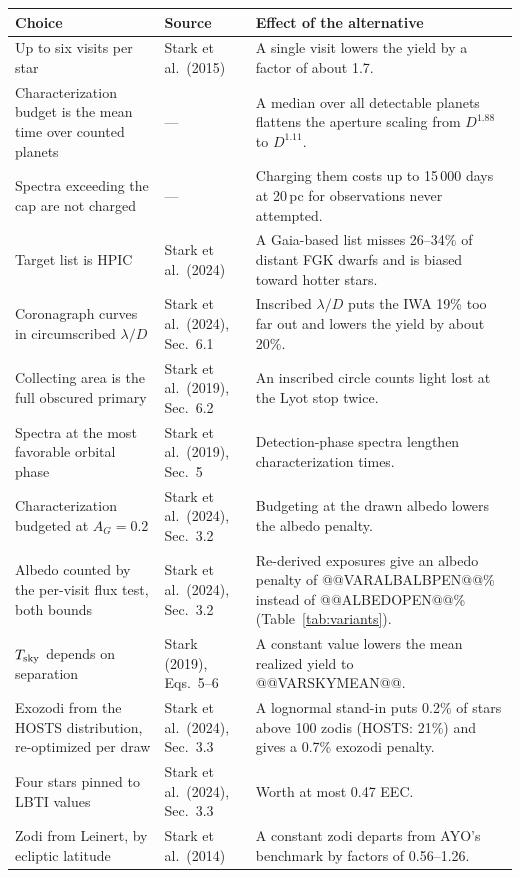 \documentclass[11pt,a4paper]{article}
\begin{document}
\begin{table}[htbp]
\centering
\scriptsize
\begin{tabular}{p{4.2cm}p{3.6cm}p{7.4cm}}
\toprule
\textbf{Choice} & \textbf{Source} & \textbf{Effect of the alternative} \\
\midrule
Up to six visits per star & Stark et al.\ (2015) & A single visit lowers the yield by a factor of about 1.7. \\
Characterization budget is the mean time over counted planets & --- & A median over all detectable planets flattens the aperture scaling from $D^{1.88}$ to $D^{1.11}$. \\
Spectra exceeding the cap are not charged & --- & Charging them costs up to 15\,000 days at 20\,pc for observations never attempted. \\
Target list is HPIC & Stark et al.\ (2024) & A Gaia-based list misses 26--34\% of distant FGK dwarfs and is biased toward hotter stars. \\
Coronagraph curves in circumscribed $\lambda/D$ & Stark et al.\ (2024), Sec.~6.1 & Inscribed $\lambda/D$ puts the IWA 19\% too far out and lowers the yield by about 20\%. \\
Collecting area is the full obscured primary & Stark et al.\ (2019), Sec.~6.2 & An inscribed circle counts light lost at the Lyot stop twice. \\
Spectra at the most favorable orbital phase & Stark et al.\ (2019), Sec.~5 & Detection-phase spectra lengthen characterization times. \\
Characterization budgeted at $A_G = 0.2$ & Stark et al.\ (2024), Sec.~3.2 & Budgeting at the drawn albedo lowers the albedo penalty. \\
Albedo counted by the per-visit flux test, both bounds & Stark et al.\ (2024), Sec.~3.2 & Re-derived exposures give an albedo penalty of @@VARALBALBPEN@@\% instead of @@ALBEDOPEN@@\% (Table~\ref{tab:variants}). \\
$T_{\rm sky}$ depends on separation & Stark (2019), Eqs.~5--6 & A constant value lowers the mean realized yield to @@VARSKYMEAN@@. \\
Exozodi from the HOSTS distribution, re-optimized per draw & Stark et al.\ (2024), Sec.~3.3 & A lognormal stand-in puts 0.2\% of stars above 100 zodis (HOSTS: 21\%) and gives a 0.7\% exozodi penalty. \\
Four stars pinned to LBTI values & Stark et al.\ (2024), Sec.~3.3 & Worth at most 0.47 EEC. \\
Zodi from Leinert, by ecliptic latitude & Stark et al.\ (2014) & A constant zodi departs from AYO's benchmark by factors of 0.56--1.26. \\

\end{tabular}
\end{table}
\end{document}
